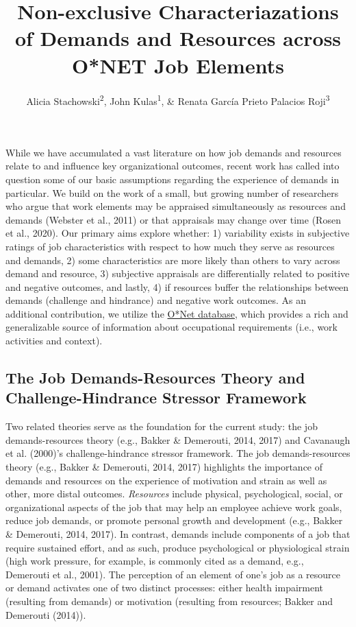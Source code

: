 \documentclass[
  man,mask]{apa7}
\title{Non-exclusive Characteriazations of Demands and Resources across O*NET Job Elements}
\author{Alicia Stachowski\textsuperscript{2}, John Kulas\textsuperscript{1}, \& Renata García Prieto Palacios Roji\textsuperscript{3}}
\date{}
\affiliation{\vspace{0.5cm}\textsuperscript{1} eRg\\\textsuperscript{2} University of Wisconsin - Stout\\\textsuperscript{3} PepsiCo}
\begin{document}
\maketitle

While we have accumulated a vast literature on how job demands and resources relate to and influence key organizational outcomes, recent work has called into question some of our basic assumptions regarding the experience of demands in particular. We build on the work of a small, but growing number of researchers who argue that work elements may be appraised simultaneously as resources and demands (Webster et al., 2011) or that appraisals may change over time (Rosen et al., 2020). Our primary aims explore whether: 1) variability exists in subjective ratings of job characteristics with respect to how much they serve as resources and demands, 2) some characteristics are more likely than others to vary across demand and resource, 3) subjective appraisals are differentially related to positive and negative outcomes, and lastly, 4) if resources buffer the relationships between demands (challenge and hindrance) and negative work outcomes. As an additional contribution, we utilize the \href{https://www.onetcenter.org/content.html}{O*Net database}, which provides a rich and generalizable source of information about occupational requirements (i.e., work activities and context).

\hypertarget{the-job-demands-resources-theory-and-challenge-hindrance-stressor-framework}{%
\subsection{The Job Demands-Resources Theory and Challenge-Hindrance Stressor Framework}\label{the-job-demands-resources-theory-and-challenge-hindrance-stressor-framework}}

Two related theories serve as the foundation for the current study: the job demands-resources theory (e.g., Bakker \& Demerouti, 2014, 2017) and Cavanaugh et al. (2000)'s challenge-hindrance stressor framework. The job demands-resources theory (e.g., Bakker \& Demerouti, 2014, 2017) highlights the importance of demands and resources on the experience of motivation and strain as well as other, more distal outcomes. \emph{Resources} include physical, psychological, social, or organizational aspects of the job that may help an employee achieve work goals, reduce job demands, or promote personal growth and development (e.g., Bakker \& Demerouti, 2014, 2017). In contrast, demands include components of a job that require sustained effort, and as such, produce psychological or physiological strain (high work pressure, for example, is commonly cited as a demand, e.g., Demerouti et al., 2001). The perception of an element of one's job as a resource or demand activates one of two distinct processes: either health impairment (resulting from demands) or motivation (resulting from resources; Bakker and Demerouti (2014)).
\end{document}
